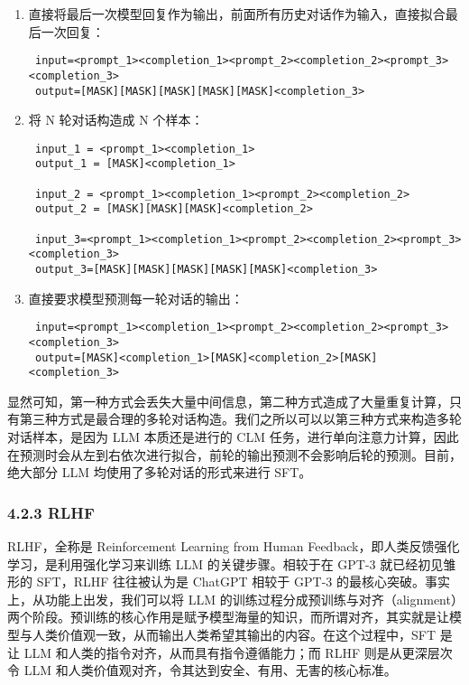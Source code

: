 \documentclass[
]{article}
\begin{document}
\begin{enumerate}
\def\labelenumi{\arabic{enumi}.}
\item
  直接将最后一次模型回复作为输出，前面所有历史对话作为输入，直接拟合最后一次回复：

\begin{verbatim}
 input=<prompt_1><completion_1><prompt_2><completion_2><prompt_3><completion_3>
 output=[MASK][MASK][MASK][MASK][MASK]<completion_3>
\end{verbatim}
\item
  将 N 轮对话构造成 N 个样本：

\begin{verbatim}
 input_1 = <prompt_1><completion_1>
 output_1 = [MASK]<completion_1>

 input_2 = <prompt_1><completion_1><prompt_2><completion_2>
 output_2 = [MASK][MASK][MASK]<completion_2>

 input_3=<prompt_1><completion_1><prompt_2><completion_2><prompt_3><completion_3>
 output_3=[MASK][MASK][MASK][MASK][MASK]<completion_3>
\end{verbatim}
\item
  直接要求模型预测每一轮对话的输出：

\begin{verbatim}
 input=<prompt_1><completion_1><prompt_2><completion_2><prompt_3><completion_3>
 output=[MASK]<completion_1>[MASK]<completion_2>[MASK]<completion_3>
\end{verbatim}
\end{enumerate}

显然可知，第一种方式会丢失大量中间信息，第二种方式造成了大量重复计算，只有第三种方式是最合理的多轮对话构造。我们之所以可以以第三种方式来构造多轮对话样本，是因为
LLM 本质还是进行的 CLM
任务，进行单向注意力计算，因此在预测时会从左到右依次进行拟合，前轮的输出预测不会影响后轮的预测。目前，绝大部分
LLM 均使用了多轮对话的形式来进行 SFT。

\subsubsection{4.2.3 RLHF}\label{rlhf}

RLHF，全称是 Reinforcement Learning from Human
Feedback，即人类反馈强化学习，是利用强化学习来训练 LLM
的关键步骤。相较于在 GPT-3 就已经初见雏形的 SFT，RLHF 往往被认为是
ChatGPT 相较于 GPT-3 的最核心突破。事实上，从功能上出发，我们可以将 LLM
的训练过程分成预训练与对齐（alignment）两个阶段。预训练的核心作用是赋予模型海量的知识，而所谓对齐，其实就是让模型与人类价值观一致，从而输出人类希望其输出的内容。在这个过程中，SFT
是让 LLM 和人类的指令对齐，从而具有指令遵循能力；而 RLHF
则是从更深层次令 LLM
和人类价值观对齐，令其达到安全、有用、无害的核心标准。
\end{document}
